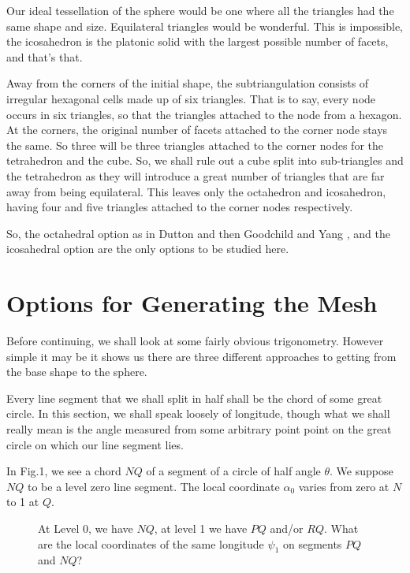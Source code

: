 \documentclass[12pt]{article}
\begin{document}
Our ideal tessellation
of the sphere would be one  where all the triangles had the same 
shape and size.
Equilateral triangles would be wonderful. This is impossible,
the icosahedron is the platonic solid with the largest possible 
number of facets, and
that's that.

Away from the corners of the initial shape, the subtriangulation 
consists of irregular hexagonal cells made up of six triangles.
That is to say, every node occurs in six triangles, so that the
triangles attached to the node from a hexagon. At the corners,
the original number of facets attached to the corner node stays
the same. So  three will be three triangles attached to
the corner nodes for the  tetrahedron and the cube. So, we shall
rule out a cube split into sub-triangles and the tetrahedron
as they will introduce a great number of triangles that are far
away from being equilateral. This leaves only the octahedron
and icosahedron, having four and five triangles attached to the corner nodes
respectively.

So, the octahedral option as in Dutton \cite{Dutton:Mybib} and
then  Goodchild and Yang \cite{Goodchild:Mybib},
and the icosahedral option \cite{Fekete:Mybib} 
are the only options to be studied here. 


\section{Options for Generating the Mesh}

 Before continuing, we shall look at
some fairly obvious trigonometry. However simple it may be it shows
us there are three different approaches to getting from the base shape
to the sphere.

Every line segment that we
shall split in half shall be the chord of some great circle. In this
section, we shall 
speak loosely of longitude, though what we shall really mean
is the angle measured from some arbitrary point point on the great circle
on which our line segment lies.

In Fig.1, we see a chord $NQ$ of a segment of a circle of half angle $\theta$. We suppose
$NQ$ to be a level zero line segment.
The local coordinate $\alpha_0$ varies from zero at $N$ to 1 at $Q$.
\vspace*{10cm}
\begin{figure}[htb]
\caption{ 
At Level 0, we have $NQ$, at level 1 we have $PQ$ and/or $RQ$.
What are the local coordinates of the same longitude $\psi_1$ on
segments $PQ$ and $NQ$?
}
\end{figure}
\end{document}

